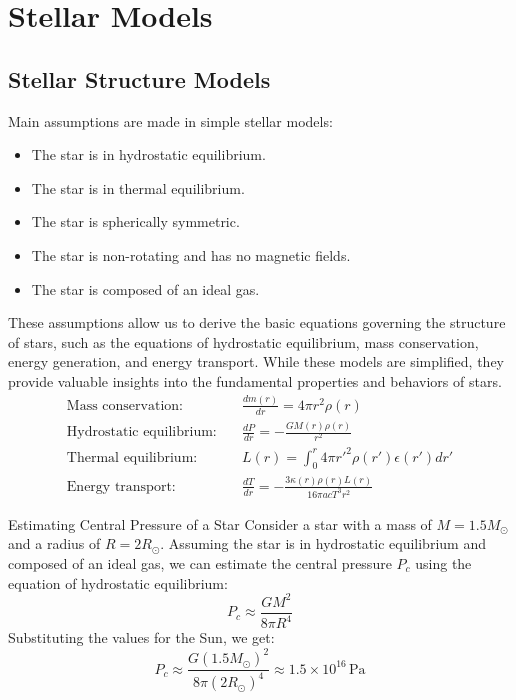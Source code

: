 \chapter{Stellar Models}

\section{Stellar Structure Models} 
Main assumptions are made in simple stellar models:
\begin{itemize}
    \item The star is in hydrostatic equilibrium.
    \item The star is in thermal equilibrium.
    \item The star is spherically symmetric.
    \item The star is non-rotating and has no magnetic fields.
    \item The star is composed of an ideal gas.
\end{itemize}
\begin{theory}
These assumptions allow us to derive the basic equations governing the structure of stars, such as the equations of hydrostatic equilibrium, mass conservation, energy generation, and energy transport. While these models are simplified, they provide valuable insights into the fundamental properties and behaviors of stars.
\begin{align}
\text{Mass conservation}: \quad &\frac{dm(r)}{dr} = 4\pi r^2 \rho(r) \\
\text{Hydrostatic equilibrium}: \quad &\frac{dP}{dr} = -\frac{G M(r) \rho(r)}{r^2} \\
\text{Thermal equilibrium}: \quad &L(r) = \int_0^r 4\pi r'^2 \rho(r') \epsilon(r') dr' \\
\text{Energy transport}: \quad &\frac{dT}{dr} = -\frac{3 \kappa(r) \rho(r) L(r)}{16\pi a c T^3 r^2}
\end{align}
\end{theory}

\begin{example}{Estimating Central Pressure of a Star}
Consider a star with a mass of $M = 1.5 M_\odot$ and a radius of $R = 2 R_\odot$. Assuming the star is in hydrostatic equilibrium and composed of an ideal gas, we can estimate the central pressure $P_c$ using the equation of hydrostatic equilibrium:
\begin{equation}
P_c \approx \frac{G M^2}{8\pi R^4}
\end{equation}
Substituting the values for the Sun, we get:
\begin{equation}
P_c \approx \frac{G (1.5 M_\odot)^2}{8\pi (2 R_\odot)^4} \approx 1.5 \times 10^{16} \, \text{Pa}
\end{equation}
\end{example}

